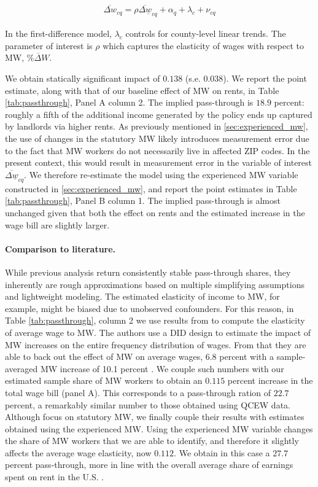 \begin{align}
	\overline{\Delta w}_{cq} = \rho \overline{\Delta \underline{w}}_{cq} + \alpha_{q} + \lambda_{c} + \nu_{cq}
\end{align}

In the first-difference model, $\lambda_{c}$ controls for county-level linear trends. 
The parameter of interest is $\rho$ which captures the elasticity of wages with respect to 
MW, $\overline{\% \Delta W}$. 

We obtain statically significant impact of $0.138$ (s.e. $0.038$). 
We report the point estimate, along with that of our baseline effect of MW on rents, in 
Table \ref{tab:passthrough}, Panel A column 2. The implied pass-through is $18.9$ percent: 
roughly a fifth of the additional income generated by the policy ends up captured by landlords 
via higher rents. As previously mentioned in \autoref{sec:experienced_mw}, the use of changes in the statutory 
MW likely introduces measurement error due to the fact that MW workers do not necessarily 
live in affected ZIP codes. In the present context, this would result in measurement error in 
the variable of interest $\overline{\Delta \underline{w}}_{cq}$. We therefore re-estimate the model 
using the experienced MW variable constructed in \autoref{sec:experienced_mw}, and report the point 
estimates in Table \ref{tab:passthrough}, Panel B column 1. The implied pass-through is almost unchanged
given that both the effect on rents and the estimated increase in the wage bill are slightly larger. \\

\paragraph{Comparison to literature.} While previous analysis return consistently stable 
pass-through shares, they inherently are rough approximations based on multiple simplifying 
assumptions and lightweight modeling. The estimated elasticity of income to MW, for example, 
might be biased due to unobserved confounders. For this reason, in Table \ref{tab:passthrough}, 
column 2 we use results from \textcite{CegnizEtAl2019} to compute the elasticity of 
average wage to MW. The authors use a DID design to estimate the impact of 
MW increases on the entire frequency distribution of wages. From that they are able to back out the effect of 
MW on average wages, 6.8 percent with a sample-averaged MW increase of 10.1 percent 
\parencite[Table I]{CegnizEtAl2019}. We couple such numbers with our estimated sample share 
of MW workers to obtain an $0.115$ percent increase in the total wage bill (panel A). This corresponds to 
a pass-through ration of $22.7$ percent, a remarkably similar number to those obtained using 
QCEW data. Although \textcite{CegnizEtAl2019} focus on statutory MW, we finally couple their results with 
estimates obtained using the experienced MW. Using the experienced MW variable changes the share of MW 
workers that we are able to identify, and therefore it slightly affects the average wage elasticity, now $0.112$. We obtain in this 
case a $27.7$ percent pass-through, more in line with the 
overall average share of earnings spent on rent in the U.S. \parencite{fernald2020americas}.   

